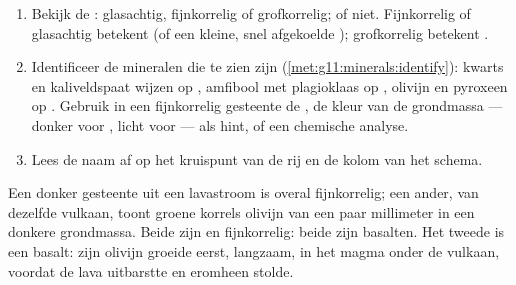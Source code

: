 \begin{method}\label{met:g11:igneous-rocks:naming}
\begin{enumerate}
  \item Bekijk de : glasachtig, fijnkorrelig of grofkorrelig;
         of niet. Fijnkorrelig of glasachtig betekent  (of een
        kleine, snel afgekoelde ); grofkorrelig betekent .
  \item Identificeer de mineralen die te zien zijn
        (\cref{met:g11:minerals:identify}): kwarts en kaliveldspaat
        wijzen op , amfibool met plagioklaas op , olivijn
        en pyroxeen op . Gebruik in een fijnkorrelig gesteente de ,
        de kleur van de grondmassa --- donker voor , licht voor  ---
        als hint, of een chemische analyse.
  \item Lees de naam af op het kruispunt van de rij en de kolom van het
        schema.
\end{enumerate}
\end{method}

\begin{example}
Een donker gesteente uit een lavastroom is overal fijnkorrelig; een ander, van
dezelfde vulkaan, toont groene korrels olivijn van een paar millimeter in een
donkere grondmassa. Beide zijn  en fijnkorrelig: beide zijn basalten. Het
tweede is een  basalt: zijn olivijn groeide eerst, langzaam, in het
magma onder de vulkaan, voordat de lava uitbarstte en eromheen stolde.
\end{example}

